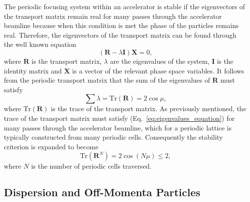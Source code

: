 \documentclass[../main.tex]{subfiles}
\begin{document}
The periodic focusing system within an accelerator is stable if the eigenvectors of the transport matrix remain real for many passes through the accelerator beamline because when this condition is met the phase of the particles remains real. Therefore, the eigenvectors of the transport matrix can be found through the well known equation
\begin{equation}
\left(\boldsymbol{R}-\lambda\boldsymbol{I}\right)\boldsymbol{X} = 0,
\label{eq:eigenvalues_equation}    
\end{equation}
where $\boldsymbol{R}$ is the transport matrix, $\lambda$ are the eigenvalues of the system, $\boldsymbol{I}$ is the identity matrix and $\boldsymbol{X}$ is a vector of the relevant phase space variables. It follows from the periodic transport matrix that the sum of the eigenvalues of $\boldsymbol{R}$ must satisfy
\begin{equation}
\sum\lambda = \boldsymbol{\mathrm{Tr}}\left(\boldsymbol{R}\right) = 2\cos\mu,
\label{eq:eigenvalue_stability}
\end{equation}
where $\boldsymbol{\mathrm{Tr}}\left(\boldsymbol{R}\right)$ is the trace of the transport matrix. As previously mentioned, the trace of the transport matrix must satisfy (Eq.~\ref{eq:eigenvalues_equation}) for many passes through the accelerator beamline, which for a periodic lattice is typically constructed from many periodic cells. Consequently the stability criterion is expanded to become
\begin{equation}
\boldsymbol{\mathrm{Tr}}\left(\boldsymbol{R}^{N}\right) = 2\cos\left(N\mu\right) \leq 2, 
\label{eq:stability_criterion}    
\end{equation}
where $N$ is the number of periodic cells traversed.

\subsection{Dispersion and Off-Momenta Particles} 
\label{sec:dispersion_off_momentum_particles}
\end{document}
